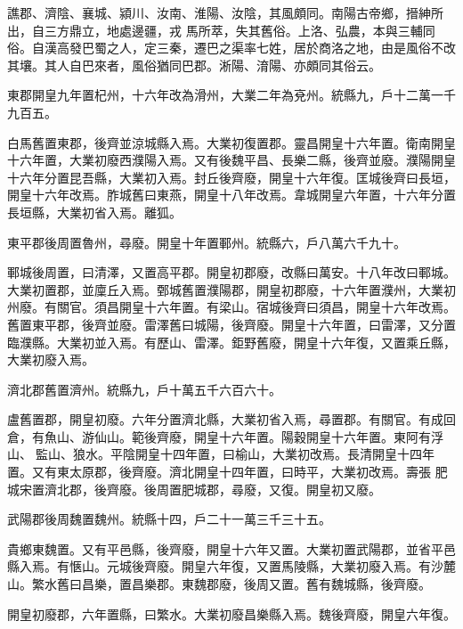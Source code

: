 \begin{pinyinscope}
 譙郡、濟陰、襄城、潁川、汝南、淮陽、汝陰，其風頗同。南陽古帝鄉，搢紳所出，自三方鼎立，地處邊疆，戎
 馬所萃，失其舊俗。上洛、弘農，本與三輔同俗。自漢高發巴蜀之人，定三秦，遷巴之渠率七姓，居於商洛之地，由是風俗不改其壤。其人自巴來者，風俗猶同巴郡。淅陽、淯陽、亦頗同其俗云。



 東郡開皇九年置杞州，十六年改為滑州，大業二年為兗州。統縣九，戶十二萬一千九百五。



 白馬舊置東郡，後齊並涼城縣入焉。大業初復置郡。靈昌開皇十六年置。衛南開皇十六年置，大業初廢西濮陽入焉。又有後魏平昌、長樂二縣，後齊並廢。濮陽開皇十六年分置昆吾縣，大業初入焉。封丘後齊廢，開皇十六年復。匡城後齊曰長垣，開皇十六年改焉。胙城舊曰東燕，開皇十八年改焉。韋城開皇六年置，十六年分置長垣縣，大業初省入焉。離狐。



 東平郡後周置魯州，尋廢。開皇十年置鄆州。統縣六，戶八萬六千九十。



 鄆城後周置，曰清澤，又置高平郡。開皇初郡廢，改縣曰萬安。十八年改曰鄆城。大業初置郡，並廩丘入焉。鄄城舊置濮陽郡，開皇初郡廢，十六年置濮州，大業初州廢。有關官。須昌開皇十六年置。有梁山。宿城後齊曰須昌，開皇十六年改焉。舊置東平郡，後齊並廢。雷澤舊曰城陽，後齊廢。開皇十六年置，曰雷澤，又分置臨濮縣。大業初並入焉。有歷山、雷澤。鉅野舊廢，開皇十六年復，又置乘丘縣，大業初廢入焉。



 濟北郡舊置濟州。統縣九，戶十萬五千六百六十。



 盧舊置郡，開皇初廢。六年分置濟北縣，大業初省入焉，尋置郡。有關官。有成回倉，有魚山、游仙山。範後齊廢，開皇十六年置。陽穀開皇十六年置。東阿有浮山、監山、狼水。平陰開皇十四年置，曰榆山，大業初改焉。長清開皇十四年置。又有東太原郡，後齊廢。濟北開皇十四年置，曰時平，大業初改焉。壽張
 肥城宋置濟北郡，後齊廢。後周置肥城郡，尋廢，又復。開皇初又廢。



 武陽郡後周魏置魏州。統縣十四，戶二十一萬三千三十五。



 貴鄉東魏置。又有平邑縣，後齊廢，開皇十六年又置。大業初置武陽郡，並省平邑縣入焉。有愜山。元城後齊廢。開皇六年復，又置馬陵縣，大業初廢入焉。有沙麓山。繁水舊曰昌樂，置昌樂郡。東魏郡廢，後周又置。舊有魏城縣，後齊廢。



 開皇初廢郡，六年置縣，曰繁水。大業初廢昌樂縣入焉。魏後齊廢，開皇六年復。




\end{pinyinscope}

